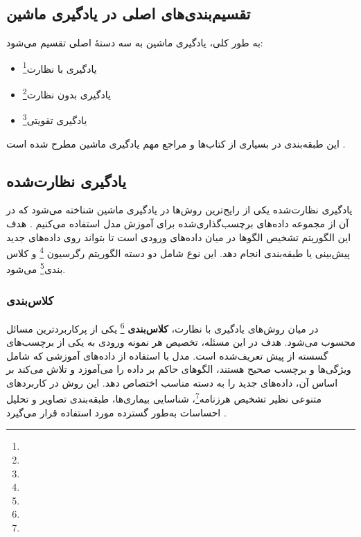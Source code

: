 \subsection{تقسیم‌بندی‌های اصلی در یادگیری ماشین}
به طور کلی، یادگیری ماشین به سه دستهٔ اصلی تقسیم می‌شود:
\begin{itemize}
 	\item یادگیری با نظارت\footnote{}
	\item یادگیری بدون نظارت\footnote{}
	\item یادگیری تقویتی\footnote{}	
\end{itemize}
این طبقه‌بندی در بسیاری از کتاب‌ها و مراجع مهم یادگیری ماشین مطرح شده است
\cite{bishop2006pattern,murphy2012machine}.

\subsection{یادگیری نظارت‌شده}
یادگیری نظارت‌شده یکی از رایج‌ترین روش‌ها در یادگیری ماشین شناخته می‌شود که در آن از مجموعه داده‌های برچسب‌گذاری‌شده برای آموزش مدل استفاده می‌کنیم \cite{james2013introduction}. هدف این الگوریتم تشخیص الگوها در میان داده‌های ورودی است تا بتواند روی داده‌های جدید پیش‌بینی یا طبقه‌بندی انجام دهد. این نوع شامل دو دسته الگوریتم رگرسیون \footnote{} و کلاس بندی\footnote{} می‌شود.


\subsubsection{کلاس‌بندی}

در میان روش‌های یادگیری با نظارت، \textbf{کلاس‌بندی} \footnote{} یکی از پرکاربردترین مسائل محسوب می‌شود. هدف در این مسئله، تخصیص هر نمونه ورودی به یکی از برچسب‌های گسسته از پیش تعریف‌شده است. مدل با استفاده از داده‌های آموزشی که شامل ویژگی‌ها و برچسب صحیح هستند، الگوهای حاکم بر داده را می‌آموزد و تلاش می‌کند بر اساس آن، داده‌های جدید را به دسته مناسب اختصاص دهد. این روش در کاربردهای متنوعی نظیر تشخیص هرزنامه\footnote{}، شناسایی بیماری‌ها، طبقه‌بندی تصاویر و تحلیل احساسات به‌طور گسترده مورد استفاده قرار می‌گیرد \cite{bishop2006pattern,murphy2012machine}.


